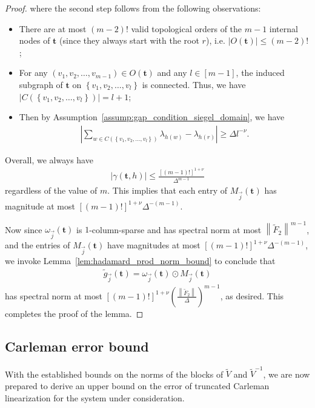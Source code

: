\documentclass[superscriptaddress,onecolumn,nofootinbib,longbibliography,a4paper,accepted=2026-09-29]{quantumarticle}
\theoremstyle{plain}
\theoremstyle{definition}
\numberwithin{thm}{section}
\numberwithin{assumption}{section}
\numberwithin{lemma}{section}
\numberwithin{prop}{section}
\numberwithin{cor}{section}
\numberwithin{definition}{section}
\numberwithin{rmk}{section}
\numberwithin{equation}{section}
\newcommand{\abs}[1]      {\left| #1 \right|}
\newcommand{\norm}[1]     {\left\| #1 \right\|}
\newcommand{\lrb}[1]{\left ( #1 \right )}
\newcommand{\lrcb}[1]{\left \{ #1 \right \}}
\newcommand{\mbt}{\mathbf{t}}
\begin{document}
\begin{proof}
where the second step follows from the following observations:
\begin{itemize}
    \item There are at most $(m-2)!$ valid topological orders of the $m-1$ internal nodes of $\mbt$ (since they always start with the root $r$), i.e. $|O(\mbt)| \le (m-2)!$;
    \item For any $(v_1,v_2,\dots,v_{m-1}) \in O(\mbt)$ and any $l \in [m-1]$, the induced subgraph of $\mbt$ on $\lrcb{v_1,v_2,\dots,v_l}$ is connected. Thus, we have
    $|C(\lrcb{v_1,v_2,\dots,v_l})|=l+1$;
    \item Then by Assumption~\ref{assump:gap_condition_siegel_domain}, we have 
    \begin{align}
        \abs{\sum_{w \in C(\lrcb{v_1,v_2,\dots,v_l})} \lambda_{h(w)} -\lambda_{h(r)}} \ge \Delta l^{-\nu}.
    \end{align}
\end{itemize}
Overall, we always have
\begin{align}
    \abs{\gamma(\mbt, h)} \le \frac{[(m-1)!]^{1+\nu}}{\Delta^{m-1}}
\end{align}
regardless of the value of $m$. This implies that each entry of $M_{\vec j}(\mbt)$ has magnitude at most $[(m-1)!]^{1+\nu}\Delta^{-(m-1)}$.

Now since $\omega_{\vec j}(\mbt)$ is $1$-column-sparse and has spectral norm at most $\norm{\tilde{F}_2}^{m-1}$, and the entries of $M_{\vec j}(\mbt)$ have magnitudes at most $[(m-1)!]^{1+\nu}\Delta^{-(m-1)}$, we invoke Lemma~\ref{lem:hadamard_prod_norm_bound} to conclude that 
\begin{align}
\tilde{g}_{\vec j}(\mbt) = \omega_{\vec j}(\mbt) \odot M_{\vec j}(\mbt)    
\end{align}
has spectral norm at most $[(m-1)!]^{1+\nu}\lrb{\frac{\norm{\tilde{F}_2}}{\Delta}}^{m-1}$, as desired. This completes the proof of the lemma.    
\end{proof}


\subsection{Carleman error bound}

With the established bounds on the norms of the blocks of $\tilde{V}$ and $\tilde{V}^{-1}$, we are now prepared to derive an upper bound on the error of truncated Carleman linearization for the system under consideration. 
\end{document}
